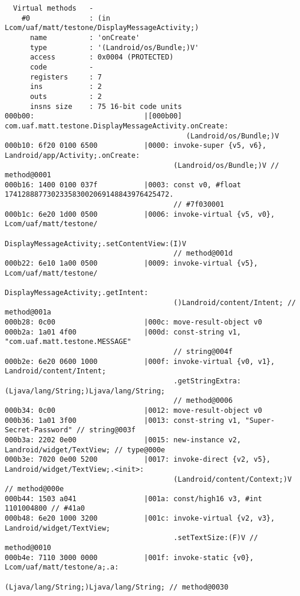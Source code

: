 \begin{lstlisting}
  Virtual methods   -
    #0              : (in Lcom/uaf/matt/testone/DisplayMessageActivity;)
      name          : 'onCreate'
      type          : '(Landroid/os/Bundle;)V'
      access        : 0x0004 (PROTECTED)
      code          -
      registers     : 7
      ins           : 2
      outs          : 2
      insns size    : 75 16-bit code units
000b00:                          |[000b00] com.uaf.matt.testone.DisplayMessageActivity.onCreate:
                                           (Landroid/os/Bundle;)V
000b10: 6f20 0100 6500           |0000: invoke-super {v5, v6}, Landroid/app/Activity;.onCreate:
                                        (Landroid/os/Bundle;)V // method@0001
000b16: 1400 0100 037f           |0003: const v0, #float 174128887730233583002069148843976425472.
                                        // #7f030001
000b1c: 6e20 1d00 0500           |0006: invoke-virtual {v5, v0}, Lcom/uaf/matt/testone/
                                        DisplayMessageActivity;.setContentView:(I)V
                                        // method@001d
000b22: 6e10 1a00 0500           |0009: invoke-virtual {v5}, Lcom/uaf/matt/testone/
                                        DisplayMessageActivity;.getIntent:
                                        ()Landroid/content/Intent; // method@001a
000b28: 0c00                     |000c: move-result-object v0
000b2a: 1a01 4f00                |000d: const-string v1, "com.uaf.matt.testone.MESSAGE"
                                        // string@004f
000b2e: 6e20 0600 1000           |000f: invoke-virtual {v0, v1}, Landroid/content/Intent;
                                        .getStringExtra:(Ljava/lang/String;)Ljava/lang/String;
                                        // method@0006
000b34: 0c00                     |0012: move-result-object v0
000b36: 1a01 3f00                |0013: const-string v1, "Super-Secret-Password" // string@003f
000b3a: 2202 0e00                |0015: new-instance v2, Landroid/widget/TextView; // type@000e
000b3e: 7020 0e00 5200           |0017: invoke-direct {v2, v5}, Landroid/widget/TextView;.<init>:
                                        (Landroid/content/Context;)V // method@000e
000b44: 1503 a041                |001a: const/high16 v3, #int 1101004800 // #41a0
000b48: 6e20 1000 3200           |001c: invoke-virtual {v2, v3}, Landroid/widget/TextView;
                                        .setTextSize:(F)V // method@0010
000b4e: 7110 3000 0000           |001f: invoke-static {v0}, Lcom/uaf/matt/testone/a;.a:
                                        (Ljava/lang/String;)Ljava/lang/String; // method@0030

\end{lstlisting}
